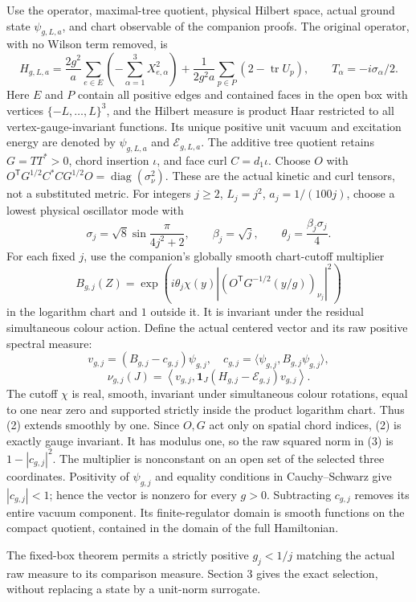 \documentclass[
  11pt,
]{article}
\begin{document}
Use the operator, maximal-tree quotient, physical Hilbert space, actual
ground state \(\psi_{g,L,a}\), and chart observable of the companion
proofs. The original operator, with no Wilson term removed, is \[
 H_{g,L,a}=\frac{2g^2}{a}\sum_{e\in E}
 \left(-\sum_{\alpha=1}^3X_{e,\alpha}^2\right)
 +\frac1{2g^2a}\sum_{p\in P}(2-\operatorname{tr}U_p),
 \qquad T_\alpha=-i\sigma_\alpha/2.
\] Here \(E\) and \(P\) contain all positive edges and contained faces
in the open box with vertices \(\{-L,\ldots,L\}^3\), and the Hilbert
measure is product Haar restricted to all vertex-gauge-invariant
functions. Its unique positive unit vacuum and excitation energy are
denoted by \(\psi_{g,L,a}\) and \(\mathcal E_{g,L,a}\). The additive
tree quotient retains \(G=TT^*>0\), chord insertion \(\iota\), and face
curl \(C=d_1\iota\). Choose \(O\) with
\(O^{\mathsf T}G^{1/2}C^*CG^{1/2}O=\operatorname{diag}(\sigma_\nu^2)\).
These are the actual kinetic and curl tensors, not a substituted metric.
For integers \(j\ge2\), \(L_j=j^2\), \(a_j=1/(100j)\), choose a lowest
physical oscillator mode with \[
 \sigma_j=\sqrt8\sin\frac{\pi}{4j^2+2},\qquad
 \beta_j=\sqrt j,\qquad \theta_j=\frac{\beta_j\sigma_j}{4}.
 \tag{1}
\] For each fixed \(j\), use the companion's globally smooth
chart-cutoff multiplier \[
 B_{g,j}(Z)=
 \exp\!\left(i\theta_j\chi(y)
 \left|(O^{\mathsf T}G^{-1/2}(y/g))_{\nu_j}\right|^2\right)
 \tag{2}
\] in the logarithm chart and \(1\) outside it. It is invariant under
the residual simultaneous colour action. Define the actual centered
vector and its raw positive spectral measure: \[
 v_{g,j}=(B_{g,j}-c_{g,j})\psi_{g,j},\quad
 c_{g,j}=\langle\psi_{g,j},B_{g,j}\psi_{g,j}\rangle,
\] \[
 \nu_{g,j}(J)=
 \left\langle v_{g,j},
 \mathbf1_J(H_{g,j}-\mathcal E_{g,j})v_{g,j}\right\rangle .
 \tag{3}
\] The cutoff \(\chi\) is real, smooth, invariant under simultaneous
colour rotations, equal to one near zero and supported strictly inside
the product logarithm chart. Thus (2) extends smoothly by one. Since
\(O,G\) act only on spatial chord indices, (2) is exactly gauge
invariant. It has modulus one, so the raw squared norm in (3) is
\(1-|c_{g,j}|^2\). The multiplier is nonconstant on an open set of the
selected three coordinates. Positivity of \(\psi_{g,j}\) and equality
conditions in Cauchy--Schwarz give \(|c_{g,j}|<1\); hence the vector is
nonzero for every \(g>0\). Subtracting \(c_{g,j}\) removes its entire
vacuum component. Its finite-regulator domain is smooth functions on the
compact quotient, contained in the domain of the full Hamiltonian.

The fixed-box theorem permits a strictly positive \(g_j<1/j\) matching
the actual raw measure to its comparison measure. Section 3 gives the
exact selection, without replacing a state by a unit-norm surrogate.
\end{document}
